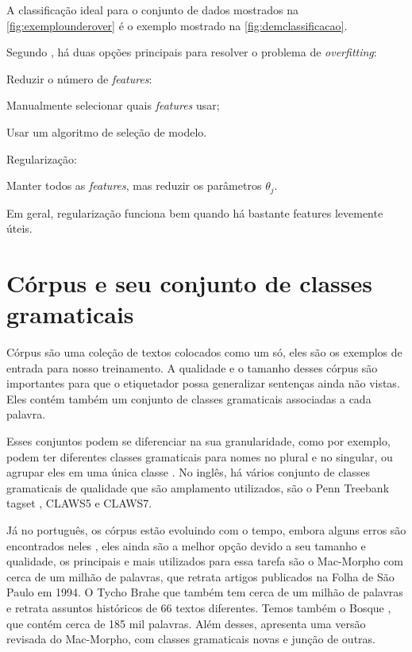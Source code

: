 A classificação ideal para o conjunto de dados mostrados na \autoref{fig:exemplounderover} é o exemplo mostrado na \autoref{fig:demclassificacao}.

Segundo \cite{machinelearningcoursera}, há duas opções principais para resolver o problema de \textit{overfitting}:

\begin{alineas}
	\item Reduzir o número de \textit{features}:
		\begin{alineas}
			\item Manualmente selecionar quais \textit{features} usar;
			\item Usar um algoritmo de seleção de modelo.
		\end{alineas}
	\item Regularização:
		\begin{alineas}
			\item Manter todos as \textit{features}, mas reduzir os parâmetros $\theta_j$.
		\end{alineas}
\end{alineas}

Em geral, regularização funciona bem quando há bastante features levemente úteis.


\section{Córpus e seu conjunto de classes gramaticais}

Córpus são uma coleção de textos colocados como um só, eles são os exemplos de entrada para nosso treinamento. A qualidade e o tamanho desses córpus são importantes para que o etiquetador possa generalizar sentenças ainda não vistas. Eles contém também um conjunto de classes gramaticais associadas a cada palavra.

Esses conjuntos podem se diferenciar na sua granularidade, como por exemplo, podem ter diferentes classes gramaticais para nomes no plural e no singular, ou agrupar eles em uma única classe \cite{fonseca2015evaluating}. No inglês, há vários conjunto de classes gramaticais de qualidade que são amplamento utilizados, são o Penn Treebank tagset \cite{penntreebank}, CLAWS5 e CLAWS7.

Já no português, os córpus estão evoluindo com o tempo, embora alguns erros são encontrados neles \cite{fonseca2013mac}, eles ainda são a melhor opção devido a seu tamanho e qualidade, os principais e mais utilizados para essa tarefa são o Mac-Morpho \cite{aluisio2003account} com cerca de um milhão de palavras, que retrata artigos publicados na Folha de São Paulo em 1994. O Tycho Brahe \cite{temponi2004corpus} que também tem cerca de um milhão de palavras e retrata assuntos históricos de 66 textos diferentes. Temos também o Bosque \cite{afonso2002floresta}, que contém cerca de 185 mil palavras. Além desses, \cite{fonseca2015evaluating} apresenta uma versão revisada do Mac-Morpho, com classes gramaticais novas e junção de outras. 

